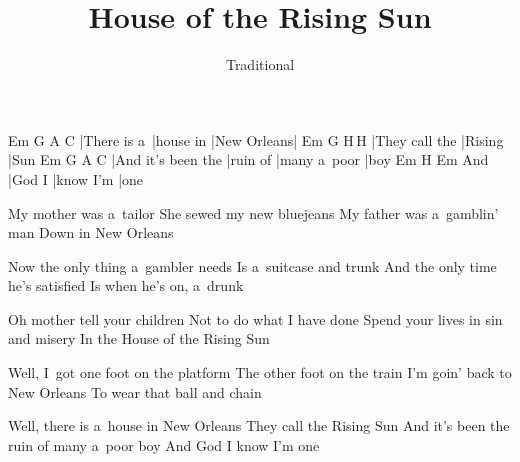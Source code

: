 \documentclass{song}
\title{House of the Rising Sun}
\author{Traditional}
\begin{document}
\strophe
Em          G         A           C
|There is a~|house in |New Orleans|
Em             G       H\,H\7
|They call the |Rising |Sun
Em                 G        A            C
|And it's been the |ruin of |many a~poor |boy
    Em     H\7       Em
And |God I |know I'm |one
\endstrophe

\strophe*
My mother was a~tailor
She sewed my new bluejeans
My father was a~gamblin' man
Down in New Orleans
\endstrophe

\strophe*
Now the only thing a~gambler needs
Is a~suitcase and trunk
And the only time he's satisfied
Is when he's on, a~drunk
\endstrophe

\strophe*
Oh mother tell your children
Not to do what I have done
Spend your lives in sin and misery
In the House of the Rising Sun
\endstrophe

\strophe*
Well, I~got one foot on the platform
The other foot on the train
I'm goin' back to New Orleans
To wear that ball and chain
\endstrophe

\strophe*
Well, there is a~house in New Orleans
They call the Rising Sun
And it's been the ruin of many a~poor boy
And God I know I'm one
\endstrophe
\end{document}
